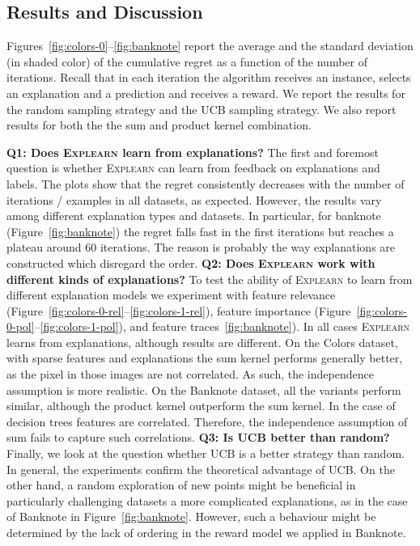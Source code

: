 \documentclass[letterpaper]{article} %
\newcommand{\explearn}{\textsc{Explearn}\xspace}
\newcommand{\colors}{{\sf Colors}\xspace}
\newcommand{\banknote}{{\sf Banknote}\xspace}
\begin{document}
\subsection{Results and Discussion}

Figures~\ref{fig:colors-0}--\ref{fig:banknote} report the average and the standard deviation (in shaded color) of the cumulative regret as a function of the number of iterations. Recall that in each iteration the algorithm receives an instance, selects an explanation and a prediction and receives a reward. We report the results for the random sampling strategy and the UCB sampling strategy. We also report results for both the the sum and product kernel combination.

\noindent\textbf{Q1: Does \explearn learn from explanations?}
%
The first and foremost question is whether \explearn can learn from feedback on explanations and labels. The plots show that the regret consistently decreases with the number of iterations / examples in all datasets, as expected. However, the results vary among different explanation types and datasets. In particular, for banknote (Figure~\ref{fig:banknote}) the regret falls fast in the first iterations but reaches a plateau around 60 iterations. The reason is probably the way explanations are constructed which disregard the order.
%
\noindent\textbf{Q2: Does \explearn work with different kinds of explanations?}
%
To test the ability of \explearn to learn from different explanation models we experiment with feature relevance (Figure~\ref{fig:colors-0-rel}--\ref{fig:colors-1-rel}), feature importance (Figure~\ref{fig:colors-0-pol}--\ref{fig:colors-1-pol}), and feature traces~\ref{fig:banknote}). In all cases \explearn learns from explanations, although results are different. On the \colors dataset, with sparse features and explanations the sum kernel performs generally better, as the pixel in those images are not correlated. As such, the independence assumption is more realistic. On the \banknote dataset, all the variants perform similar, although the product kernel outperform the sum kernel. In the case of decision trees features are correlated. Therefore, the independence assumption of sum fails to capture such correlations.
%
\noindent\textbf{Q3: Is UCB better than random?}
%
Finally, we look at the question whether UCB is a better strategy than random. In general, the experiments confirm the theoretical advantage of UCB. On the other hand, a random exploration of new points might be beneficial in particularly challenging datasets a more complicated explanations, as in the case of \banknote in Figure~\ref{fig:banknote}. However, such a behaviour might be determined by the lack of ordering in the reward model we applied in \banknote.
\end{document}
